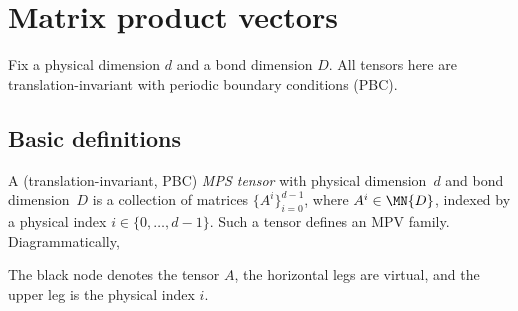 \chapter{Matrix product vectors}\label{ch:mps}

Fix a physical dimension $d$ and a bond dimension $D$.
All tensors here are translation-invariant with periodic
boundary conditions (PBC).

\section{Basic definitions}

\begin{definition}\label{def:mps_tensor}
    \leanok
    A (translation-invariant, PBC) \emph{MPS tensor} with
    physical dimension~$d$ and bond dimension~$D$ is a collection of matrices
    $\{A^i\}_{i=0}^{d-1}$, where $A^i \in \MN{D}$, indexed by a physical index
    $i \in \{0, \ldots, d{-}1\}$.
    Such a tensor defines an MPV family. Diagrammatically,
    \begin{center}
        \tenkzkernel
        \begin{tenkz}[cols=1, boundary=open]
        \end{tenkz}
    \end{center}
    The black node denotes the tensor $A$, the horizontal legs are virtual,
    and the upper leg is the physical index $i$.
\end{definition}

